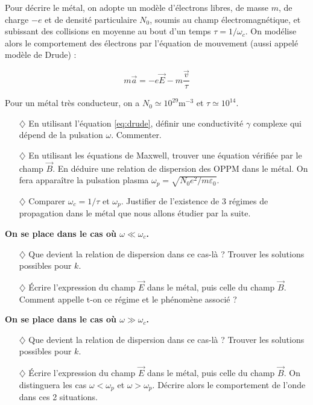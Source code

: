 \documentclass{report}
\begin{document}
Pour décrire le métal, on adopte un modèle d'électrons libres, de masse $m$, de charge $-e$ et de densité particulaire $N_0$, soumis au champ électromagnétique, et subissant des collisions en moyenne au bout d'un temps $\tau=1/\omega_c$. On modélise alors le comportement des électrons par l'équation de mouvement (aussi appelé modèle de Drude) :

\begin{equation}
	m\vec{a}=-e\vec{E}-m\frac{\vec{v}}{\tau}
	\label{eq:drude}
\end{equation}

Pour un métal très conducteur, on a $N_0\simeq10^{29}$m$^{-3}$ et $\tau\simeq10^{14}$.

\begin{itemize}

	\item[$\diamondsuit$] En utilisant l'équation \ref{eq:drude}, définir une conductivité $\gamma$ complexe qui dépend de la pulsation $\omega$. Commenter. 
	
	\item[$\diamondsuit$] En utilisant les équations de Maxwell, trouver une équation vérifiée par le champ $\vec{B}$. En déduire une relation de dispersion des OPPM dans le métal. On fera apparaître la pulsation plasma $\omega_p=\sqrt{N_0e^2/m\varepsilon_0}$.
	
	\item[$\diamondsuit$] Comparer $\omega_c=1/\tau$ et $\omega_p$. Justifier de l'existence de 3 régimes de propagation dans le métal que nous allons étudier par la suite.

\end{itemize}

\textbf{On se place dans le cas où $\omega\ll\omega_c$.}

\begin{itemize}

	\item[$\diamondsuit$] Que devient la relation de dispersion dans ce cas-là ? Trouver les solutions possibles pour $k$.

	\item[$\diamondsuit$] Écrire l'expression du champ $\vec{E}$ dans le métal, puis celle du champ $\vec{B}$. Comment appelle t-on ce régime et le phénomène associé ? 

\end{itemize}

\textbf{On se place dans le cas où $\omega\gg\omega_c$.}

\begin{itemize}

	\item[$\diamondsuit$] Que devient la relation de dispersion dans ce cas-là ? Trouver les solutions possibles pour $k$.
	
	\item[$\diamondsuit$] Écrire l'expression du champ $\vec{E}$ dans le métal, puis celle du champ $\vec{B}$. On distinguera les cas $\omega<\omega_p$ et $\omega>\omega_p$. Décrire alors le comportement de l'onde dans ces 2 situations.

\end{itemize}
\end{document}
